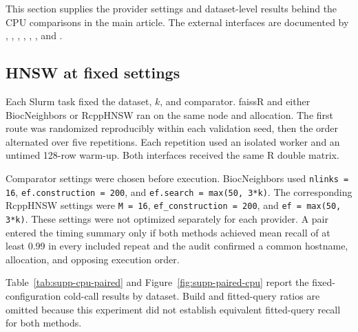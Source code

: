 \documentclass[11pt]{article}
\newcommand{\code}[1]{\texttt{#1}}
\newcommand{\pkg}[1]{\textsf{#1}}
\begin{document}
This section supplies the provider settings and dataset-level results behind
the CPU comparisons in the main article. The external interfaces are
documented by \citet{BiocNeighbors}, \citet{FNN}, \citet{RANN},
\citet{rnndescent}, \citet{Rnanoflann}, \citet{RcppAnnoy}, and
\citet{RcppHNSW}.

\subsection{HNSW at fixed settings}

Each Slurm task fixed the dataset, $k$, and comparator. \pkg{faissR} and either
\pkg{BiocNeighbors} or \pkg{RcppHNSW} ran on the same node and allocation.
The first route was randomized reproducibly within each validation seed, then
the order alternated over five repetitions. Each repetition used an isolated
worker and an untimed 128-row warm-up. Both interfaces received the same R
double matrix.

Comparator settings were chosen before execution. \pkg{BiocNeighbors} used
\code{nlinks = 16}, \code{ef.construction = 200}, and
\code{ef.search = max(50, 3*k)}. The corresponding \pkg{RcppHNSW} settings
were \code{M = 16}, \code{ef\_construction = 200}, and
\code{ef = max(50, 3*k)}. These settings were not optimized separately for
each provider. A pair entered the timing summary only if both methods
achieved mean recall of at least 0.99 in every included repeat and the audit
confirmed a common hostname, allocation, and opposing execution order.

Table~\ref{tab:supp-cpu-paired} and Figure~\ref{fig:supp-paired-cpu} report
the fixed-configuration cold-call results by dataset. Build and fitted-query
ratios are omitted because this experiment did not establish equivalent
fitted-query recall for both methods.
\end{document}
